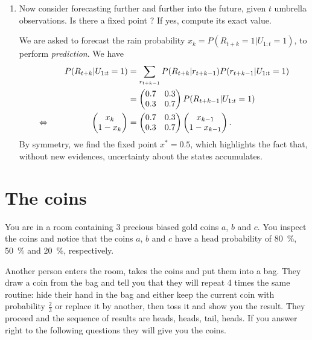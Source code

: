\documentclass[11pt, a4paper]{article}
\begin{document}
\begin{enumerate}
    \item Now consider forecasting further and further into the future, given $t$ umbrella observations. Is there a fixed point ? If yes, compute its exact value.

    \begin{solution}
        We are asked to forecast the rain probability $x_k = P(R_{t + k} = 1 | U_{1:t} = 1)$, \ie{} to perform \emph{prediction}. We have
        \begin{alignat*}{2}
            && P(R_{t+k} | U_{1:t} = 1) & = \sum_{r_{t+k-1}} P(R_{t+k} | r_{t+k-1}) P(r_{t+k-1} | U_{1:t} = 1) \\
            &&& = \begin{pmatrix}0.7 & 0.3 \\ 0.3 & 0.7\end{pmatrix} P(R_{t+k-1} | U_{1:t} = 1) \\
            \Leftrightarrow \quad && \begin{pmatrix}x_k \\ 1 - x_k\end{pmatrix} & = \begin{pmatrix}0.7 & 0.3 \\ 0.3 & 0.7\end{pmatrix} \begin{pmatrix}x_{k - 1} \\ 1 - x_{k - 1}\end{pmatrix} .
        \end{alignat*}
        By symmetry, we find the fixed point $x^* = 0.5$, which highlights the fact that, without new evidences, uncertainty about the states accumulates.
    \end{solution}
\end{enumerate}

\newpage

\section{The coins}

You are in a room containing 3 precious biased gold coins $a$, $b$ and $c$. You inspect the coins and notice that the coins $a$, $b$ and $c$ have a head probability of \qty{80}{\percent}, \qty{50}{\percent} and \qty{20}{\percent}, respectively.

Another person enters the room, takes the coins and put them into a bag. They draw a coin from the bag and tell you that they will repeat 4 times the same routine: hide their hand in the bag and either keep the current coin with probability $\frac{2}{3}$ or replace it by another, then toss it and show you the result. They proceed and the sequence of results are heads, heads, tail, heads. If you answer right to the following questions they will give you the coins.
\end{document}
